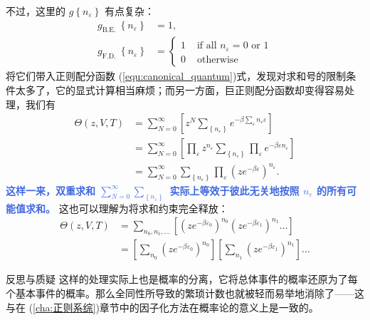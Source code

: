 不过，这里的 $g\left\{n_{\varepsilon}\right\}$ 有点复杂：
\begin{align}
    g_{\text {B.E. }}\left\{n_{\varepsilon}\right\}&=1,\\
    g_{\text {F.D. }}\left\{n_{\varepsilon}\right\}&= \begin{cases}1 & \text { if all } n_{\varepsilon}=0 \text { or } 1 \\ 0 & \text { otherwise }\end{cases}
\end{align}
将它们带入正则配分函数 (\ref*{equ:canonical_quantum})式，发现对求和号的限制条件太多了，它的显式计算相当麻烦；而另一方面，巨正则配分函数却变得容易处理，我们有
\begin{equation}\label{equ:grandcar}
    \begin{aligned}
    \Theta(z, V, T) & =\sum_{N=0}^{\infty}\left[z^N \sum_{\left\{n_{\varepsilon}\right\}} e^{-\beta \sum_{\varepsilon} n_{\varepsilon} \varepsilon}\right] \\
    &= \sum_{N=0}^{\infty}\left[\prod_\varepsilon z^{n_\varepsilon} \sum_{\left\{n_{\varepsilon}\right\}} \prod_\varepsilon e^{-\beta \varepsilon n_{\varepsilon} }\right]\\
    & =\sum_{N=0}^{\infty}\sum_{\left\{n_{\varepsilon}\right\}}\prod_{\varepsilon}\left(z e^{-\beta \varepsilon}\right)^{n_{\varepsilon}} .
    \end{aligned}
\end{equation}
\textcolor{RoyalBlue}{\textbf{\kaishu 这样一来，双重求和 $\displaystyle\sum_{N=0}^{\infty}\sum_{\left\{n_{\varepsilon}\right\}}$ 实际上等效于彼此无关地按照 $n_\varepsilon$ 的所有可能值求和。}} 这也可以理解为将求和约束完全释放：
\begin{equation}
    \begin{aligned}
    \Theta(z, V, T) & =\sum_{n_0, n_1, \ldots}\left[\left(z e^{-\beta \varepsilon_0}\right)^{n_0}\left(z e^{-\beta \varepsilon_1}\right)^{n_1} \ldots\right] \\
    & =\left[\sum_{n_0}\left(z e^{-\beta \varepsilon_0}\right)^{n_0}\right]\left[\sum_{n_1}\left(z e^{-\beta \varepsilon_1}\right)^{n_1}\right] \ldots
    \end{aligned}
\end{equation}

\begin{justification}{\kaishu 反思与质疑}
\kaishu \fontsize{11pt}{16pt}
这样的处理实际上也是概率的分离，它将总体事件的概率还原为了每个基本事件的概率。那么全同性所导致的繁琐计数也就被轻而易举地消除了——这与在 (\ref*{cha:正则系综})章节中的因子化方法在概率论的意义上是一致的。
\end{justification}

